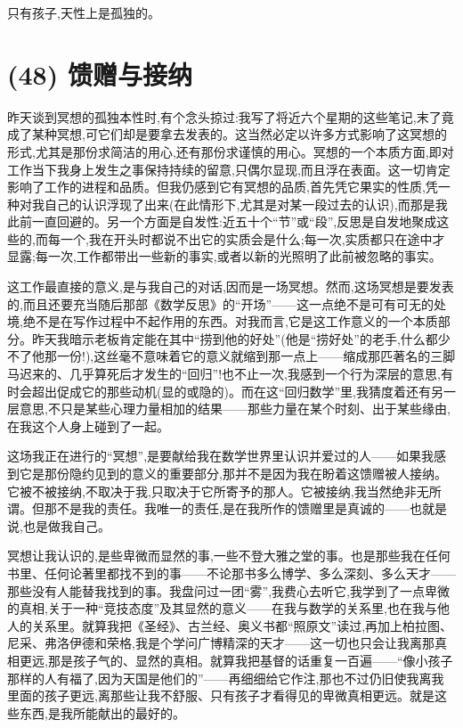 只有孩子,天性上是孤独的。

\section{(48) 馈赠与接纳}

昨天谈到冥想的孤独本性时,有个念头掠过:我写了将近六个星期的这些笔记,末了竟成了某种冥想,可它们却是要拿去发表的。这当然必定以许多方式影响了这冥想的形式,尤其是那份求简洁的用心,还有那份求谨慎的用心。冥想的一个本质方面,即对工作当下我身上发生之事保持持续的留意,只偶尔显现,而且浮在表面。这一切肯定影响了工作的进程和品质。但我仍感到它有冥想的品质,首先凭它果实的性质,凭一种对我自己的认识浮现了出来(在此情形下,尤其是对某一段过去的认识),而那是我此前一直回避的。另一个方面是自发性:近五十个“节”或“段”,反思是自发地聚成这些的,而每一个,我在开头时都说不出它的实质会是什么;每一次,实质都只在途中才显露;每一次,工作都带出一些新的事实,或者以新的光照明了此前被忽略的事实。

 这工作最直接的意义,是与我自己的对话,因而是一场冥想。然而,这场冥想是要发表的,而且还要充当随后那部《数学反思》的“开场”——这一点绝不是可有可无的处境,绝不是在写作过程中不起作用的东西。对我而言,它是这工作意义的一个本质部分。昨天我暗示老板肯定能在其中“捞到他的好处”(他是“捞好处”的老手,什么都少不了他那一份!),这丝毫不意味着它的意义就缩到那一点上——缩成那匹著名的三脚马迟来的、几乎算死后才发生的“回归”!也不止一次,我感到一个行为深层的意思,有时会超出促成它的那些动机(显的或隐的)。而在这“回归数学”里,我猜度着还有另一层意思,不只是某些心理力量相加的结果——那些力量在某个时刻、出于某些缘由,在我这个人身上碰到了一起。

这场我正在进行的“冥想”,是要献给我在数学世界里认识并爱过的人——如果我感到它是那份隐约见到的意义的重要部分,那并不是因为我在盼着这馈赠被人接纳。它被不被接纳,不取决于我,只取决于它所寄予的那人。它被接纳,我当然绝非无所谓。但那不是我的责任。我唯一的责任,是在我所作的馈赠里是真诚的——也就是说,也是做我自己。

冥想让我认识的,是些卑微而显然的事,一些不登大雅之堂的事。也是那些我在任何书里、任何论著里都找不到的事——不论那书多么博学、多么深刻、多么天才——那些没有人能替我找到的事。我盘问过一团“雾”,我费心去听它,我学到了一点卑微的真相,关于一种“竞技态度”及其显然的意义——在我与数学的关系里,也在我与他人的关系里。就算我把《圣经》、古兰经、奥义书都“照原文”读过,再加上柏拉图、尼采、弗洛伊德和荣格,我是个学问广博精深的天才——这一切也只会让我离那真相更远,那是孩子气的、显然的真相。就算我把基督的话重复一百遍——“像小孩子那样的人有福了,因为天国是他们的”——再细细给它作注,那也不过仍旧使我离我里面的孩子更远,离那些让我不舒服、只有孩子才看得见的卑微真相更远。就是这些东西,是我所能献出的最好的。

